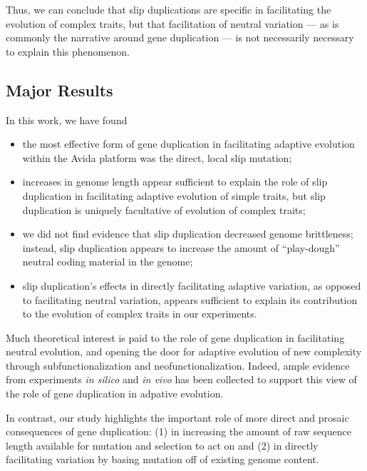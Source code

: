 Thus, we can conclude that slip duplications are specific in facilitating the evolution of complex traits, but that facilitation of neutral variation --- as is commonly the narrative around gene duplication --- is not necessarily necessary to explain this phenomenon.

\subsection{Major Results}

In this work, we have found
\begin{itemize}
\item the most effective form of gene duplication in facilitating adaptive evolution within the Avida platform was the direct, local slip mutation;
\item increases in genome length appear sufficient to explain the role of slip duplication in facilitating adaptive evolution of simple traits, but slip duplication is uniquely facultative of evolution of complex traits;
\item we did not find evidence that slip duplication decreased genome brittleness; instead, slip duplication appears to increase the amount of ``play-dough'' neutral coding material in the genome;
\item slip duplication's effects in directly facilitating adaptive variation, as opposed to facilitating neutral variation, appears sufficient to explain its contribution to the evolution of complex traits in our experiments.
\end{itemize}

Much theoretical interest is paid to the role of gene duplication in facilitating neutral evolution, and opening the door for adaptive evolution of new complexity through subfunctionalization and neofunctionalization.
Indeed, ample evidence from experiments \textit{in silico} and \textit{in vivo} has been collected to support this view of the role of gene duplication in adpative evolution.

In contrast, our study highlights the important role of more direct and prosaic consequences of gene duplication: (1) in increasing the amount of raw sequence length available for mutation and selection to act on and (2) in directly facilitating variation by basing mutation off of existing genome content.

